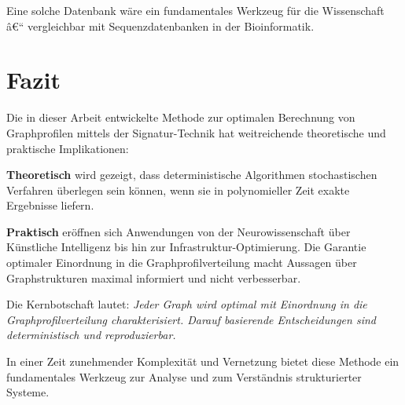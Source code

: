 ﻿\documentclass[a4paper,12pt]{article}
\theoremstyle{definition}
\begin{document}
	Eine solche Datenbank wäre ein fundamentales Werkzeug für die Wissenschaft â€“ vergleichbar mit Sequenzdatenbanken in der Bioinformatik.
	
	\section{Fazit}
	
	Die in dieser Arbeit entwickelte Methode zur optimalen Berechnung von Graphprofilen mittels der Signatur-Technik hat weitreichende theoretische und praktische Implikationen:
	
	\textbf{Theoretisch} wird gezeigt, dass deterministische Algorithmen stochastischen Verfahren überlegen sein können, wenn sie in polynomieller Zeit exakte Ergebnisse liefern.
	
	\textbf{Praktisch} eröffnen sich Anwendungen von der Neurowissenschaft über Künstliche Intelligenz bis hin zur Infrastruktur-Optimierung. Die Garantie optimaler Einordnung in die Graphprofilverteilung macht Aussagen über Graphstrukturen maximal informiert und nicht verbesserbar.
	
	Die Kernbotschaft lautet: \textit{Jeder Graph wird optimal mit Einordnung in die Graphprofilverteilung charakterisiert. Darauf basierende Entscheidungen sind deterministisch und reproduzierbar.}
	
	In einer Zeit zunehmender Komplexität und Vernetzung bietet diese Methode ein fundamentales Werkzeug zur Analyse und zum Verständnis strukturierter Systeme.
\end{document}

